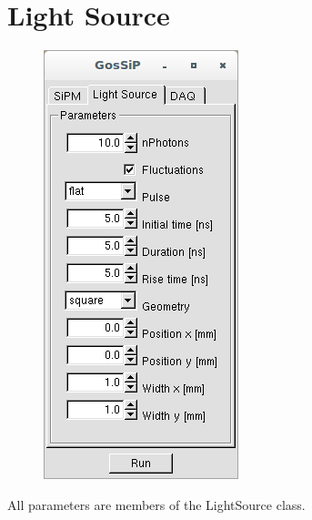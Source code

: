 \section{Light Source}

\begin{figure}[h!]
	\includegraphics[height=0.25\textheight]{GUI2.png}
\end{figure}

All parameters are members of the LightSource class.

